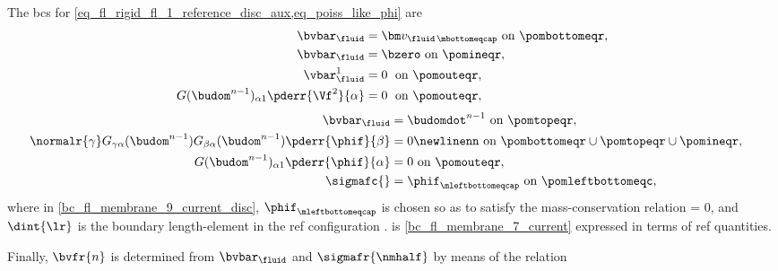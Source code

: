 The \acp{bc} for \cref{eq_fl_rigid_fl_1_reference_disc_aux,eq_poiss_like_phi} are \cite{loggAutomatedSolutionDifferential2012}
\begin{align}
    \label{bc_fl_membrane_1_current_disc}
    \bvbarf                                         & =  \vfbottom  \text{ on } \pombottomeqr, \\
    \label{bc_fl_membrane_2_current_disc}
    \bvbarf                                         & =  \bzero  \text{ on } \pomineqr,        \\
    \label{bc_fl_membrane_3_current_disc}
    \vbarf^1                                        & =  0 \; \text{ on } \pomouteqr ,         \\
    \label{bc_fl_membrane_4_current_disc}
    G(\budom^{n-1})_{\alpha 1}\pderr{\Vf^2}{\alpha} & =  0 \; \text{ on } \pomouteqr ,
\end{align}
\begin{align}
    \label{bc_fl_membrane_5_current_disc}
    \bvbarf                                                   & = \budomdot^{n-1}  \text{ on } \pomtopeqr,        \\
    \label{bc_fl_membrane_7_current_disc}
    \normalr{\gamma}  G_{\gamma \alpha}(\budom^{n-1})  G_{\beta \alpha}(\budom^{n-1})
    \pderr{ \phif   }{\beta }                                 & = 0\newlinenn
    \text{ on } \pombottomeqr \cup \pomtopeqr \cup \pomineqr, &                                                   \\
    \label{bc_fl_membrane_8_current_disc}
    G(\budom^{n-1})_{\alpha 1} \pderr{\phif}{\alpha}          & = 0 \text{ on } \pomouteqr,                       \\
    \label{bc_fl_membrane_9_current_disc}
    \sigmafc{}                                                & = \phifleftbottomc \text{ on } \pomleftbottomeqc,
\end{align}
where in \cref{bc_fl_membrane_9_current_disc}, $\phifleftbottomc$ is chosen so as to satisfy the mass-conservation relation
\be\label{bc_fl_membrane_7_reference}
\rhof {} = 0,
\ee
and $\dint{\lr}$ is the boundary length-element in the \ac{ref} configuration \cite{kamenskyLectureNotesMAE}.
 is \cref{bc_fl_membrane_7_current} expressed in terms of \ac{ref} quantities.

Finally, $\bvfr{n}$ is determined from $\bvbarf $ and $\sigmafr{\nmhalf}$ by means of the relation

